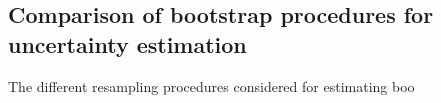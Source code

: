 \documentclass[a4paper 12pt]{article}
\numberwithin{equation}{section}
\begin{document}

\clearpage
\subsection{Comparison of bootstrap procedures for uncertainty estimation}
The different resampling procedures considered for estimating boo 
\end{document}
